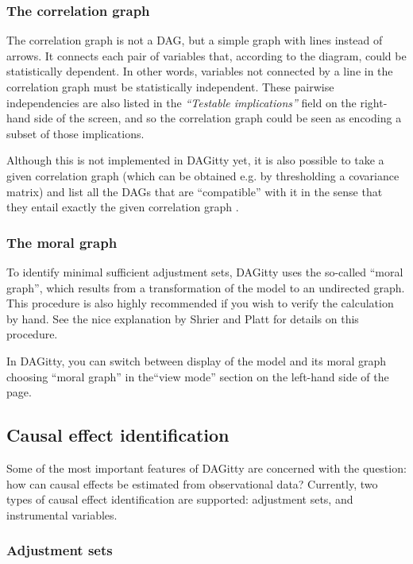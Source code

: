 \documentclass[a4paper]{article} %
\newcommand{\pp}{DAGitty\xspace}
\newcommand{\action}[1]{\emph{``#1''}}
\begin{document}
\subsubsection{The correlation graph}

The correlation graph is not a DAG, but a simple graph with lines instead of arrows. 
It connects each pair of variables that, according to the diagram, could be statistically
dependent. In other words, variables not connected by a line in the correlation graph
must be statistically independent. These pairwise independencies are also listed in the
\action{Testable implications} field on the right-hand side of the screen, and so the
correlation graph could be seen as encoding a subset of those implications. 

Although this is not implemented in \pp yet, it is also possible to take a given 
correlation graph (which can be obtained e.g. by thresholding a covariance matrix) and 
list all the DAGs that are ``compatible'' with it in the sense that they entail exactly
the given correlation graph \cite{textor15_uai}.

\subsubsection{The moral graph}

To identify minimal sufficient adjustment sets, \pp uses the so-called ``moral graph'',
which results from a transformation of the model to an undirected graph.
This procedure is also highly recommended if you wish to verify the calculation by hand.
See the nice explanation by Shrier and Platt \cite{ShrierP2008} for details on this
procedure.  

In \pp, you can switch between display of the model and its moral graph 
choosing ``moral graph'' in the``view mode'' section on the left-hand
side of the page.

\subsection{Causal effect identification}

Some of the most important features of \pp are concerned with the question: how
can causal effects be estimated from observational data? Currently, two types of causal
effect identification are supported: adjustment sets, and instrumental variables.

\subsubsection{Adjustment sets}
\end{document}
